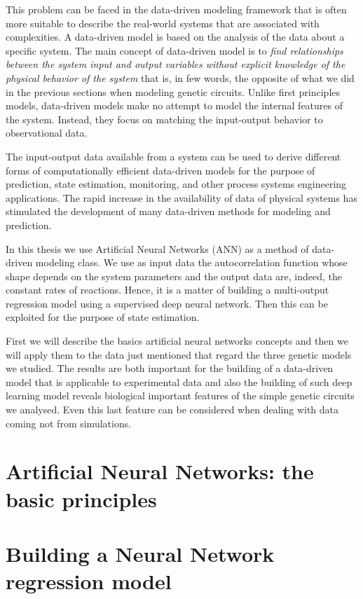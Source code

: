 \documentclass[12pt,a4paper]{report}
\begin{document}
This problem can be faced in the data-driven modeling framework that is often more suitable to describe the real-world systems that are associated with complexities. A data-driven model is based on the analysis of the data about a specific system. The main concept of data-driven model is to \emph{find relationships between the system input and output variables without explicit knowledge of the physical behavior of the system} that is, in few words, the opposite of what we did in the previous sections when modeling genetic circuits. Unlike first principles models, data-driven models make no attempt to model the internal features of the system. Instead, they focus on matching the input-output behavior to observational data. 

The input-output data available from a system can be used to derive different forms of computationally efficient data-driven models for the purpose of prediction, state estimation, monitoring, and other process systems engineering applications. The rapid increase in the availability of data of physical systems has stimulated the development of many data-driven methods for modeling and prediction. 

In this thesis we use Artificial Neural Networks (ANN) as a method of data-driven modeling class. We use as input data the autocorrelation function whose shape depends on the system parameters and the output data are, indeed, the constant rates of reactions. Hence, it is a matter of building a multi-output regression model using a supervised deep neural network. Then this can be exploited for the purpose of state estimation.

First we will describe the basics artificial neural networks concepts and then we will apply them to the data just mentioned that regard the three genetic models we studied. The results are both important for the building of a data-driven model that is applicable to experimental data and also the building of such deep learning model reveals biological important features of the simple genetic circuits we analysed. Even this last feature can be considered when dealing with data coming not from simulations. 

\section{Artificial Neural Networks: the basic principles}

\section{Building a Neural Network regression model}
\end{document}
